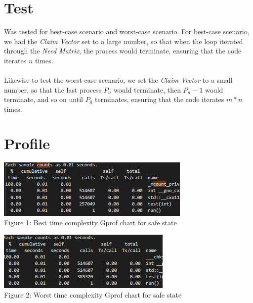 \documentclass[letterpaper,oneside,10pt]{article}
\begin{document}
\begin{left}
\begin{left}
\begin{left}
\begin{left}
\section{Test}
Was tested for best-case scenario and worst-case scenario. For best-case scenario, we had the \textit{Claim Vector} set to a large number, so that when the loop iterated through the \textit{Need Matrix}, the process would terminate, ensuring that the code iterates $n$ times. \\
\\Likewise to test the worst-case scenario, we set the \textit{Claim Vector} to a small number, so that the last process $P_n$ would terminate, then $P_n-1$ would terminate, and so on until $P_0$ terminates, ensuring that the code iterates $m*n$ times.

\section{Profile}
\begin{center}
\includegraphics{bestcase.png}\\
\caption{Figure 1: Best time complexity Gprof chart for safe state\label{fig:fig1}}
\end{center}

\begin{center}
\includegraphics[scale]{worstcase.png}\\
\caption{Figure 2: Worst time complexity Gprof chart for safe state}
\end{center}


\end{left}
\end{left}
\end{left}
\end{left}
\end{document}
